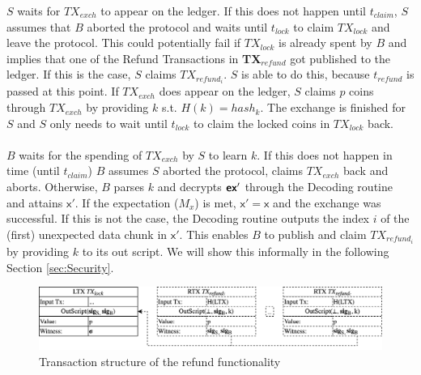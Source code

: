 \documentclass{cacthesis}
\newcounter{protocol}
\begin{document}
        $S$ waits for $TX_{exch}$ to appear on the ledger. If this does not happen until $t_{claim}$, $S$ assumes that $B$ aborted the protocol and waits until $t_{lock}$ to claim $TX_{lock}$ and leave the protocol. This could potentially fail if $TX_{lock}$ is already spent by $B$ and implies that one of the Refund Transactions in \textbf{TX$_{{refund}}$} got published to the ledger. If this is the case, $S$ claims $TX_{{refund}_i}$. $S$ is able to do this, because $t_{refund}$ is passed at this point. If $TX_{exch}$ does appear on the ledger, $S$ claims $p$ coins through $TX_{exch}$ by providing $k$ s.t. $H(k) = hash_k$. The exchange is finished for $S$ and $S$ only needs to wait until $t_{lock}$ to claim the locked coins in $TX_{lock}$ back. \\\\
        $B$ waits for the spending of $TX_{exch}$ by $S$ to learn $k$. If this does not happen in time (until $t_{claim}$) $B$ assumes $S$ aborted the protocol, claims $TX_{exch}$ back and aborts. Otherwise, $B$ parses $k$ and decrypts $\textsf{\textbf{ex}}'$ through the Decoding routine and attains $\textsf{x}'$. If the expectation ($M_x$) is met, $\textsf{x}' = \textsf{x}$ and the exchange was successful. If this is not the case, the Decoding routine outputs the index $i$ of the (first) unexpected data chunk in $\textsf{x}'$. This enables $B$ to publish and claim $TX_{{refund}_i}$ by providing $k$ to its out script. We will show this informally in the following Section \ref{sec:Security}. 


        
        
        \begin{figure}
            \begin{center}
                \includegraphics[width=\textwidth]{images/locking_refund_tx_figure.png}
              \caption{Transaction structure of the refund functionality}
              \label{fig:lockingRefundTx}
            \end{center}
            \end{figure}
            
\end{document}
